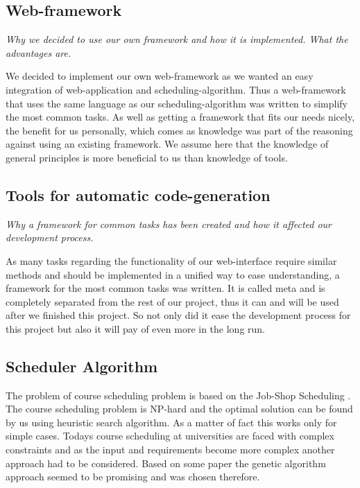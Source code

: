 \subsection{Web-framework}

\emph{Why we decided to use our own framework and how it is implemented. What the advantages are.}

We decided to implement our own web-framework as we wanted an easy integration of web-application and scheduling-algorithm. Thus a web-framework that uses the same language as our scheduling-algorithm was written to simplify the most common tasks. As well as getting a framework that fits our needs nicely, the benefit for us personally, which comes as knowledge was part of the reasoning against using an existing framework. We assume here that the knowledge of general principles is more beneficial to us than knowledge of tools.

\subsection{Tools for automatic code-generation}

\emph{Why a framework for common tasks has been created and how it affected our development process.}

As many tasks regarding the functionality of our web-interface require similar methods and should be implemented in a unified way to ease understanding, a framework for the most common tasks was written. It is called meta and is completely separated from the rest of our project, thus it can and will be used after we finished this project. So not only did it ease the development process for this project but also it will pay of even more in the long run.

\subsection{Scheduler Algorithm}
The problem of course scheduling problem is based on the Job-Shop Scheduling \cite{Ghaemi_usinga}. The course scheduling problem is NP-hard and the optimal solution can be found by us using heuristic search algorithm. As a matter of fact this works only for simple cases. Todays course scheduling at universities are faced with complex constraints and as the input and requirements become more complex another approach had to be considered. Based on some paper the genetic algorithm approach seemed to be promising and was chosen therefore.

